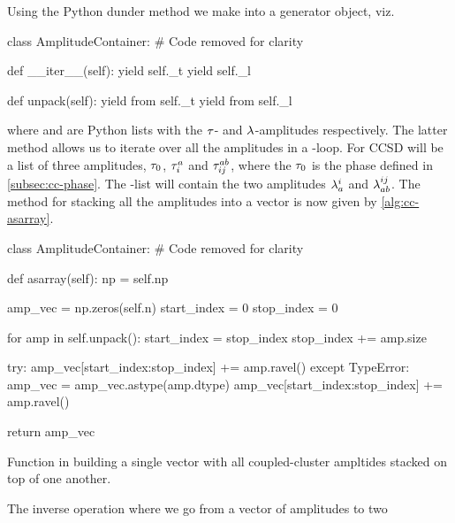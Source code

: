             Using the Python dunder method  we make
             into a generator object, viz.
            \begin{python}
class AmplitudeContainer:
    # Code removed for clarity

    def __iter__(self):
        yield self._t
        yield self._l

    def unpack(self):
        yield from self._t
        yield from self._l
            \end{python}
            where  and  are Python lists with the
            $\tau$- and $\lambda$-amplitudes respectively.
            The latter method  allows us to iterate over all the
            amplitudes in a -loop.
            For CCSD  will be a list of three amplitudes,
            $\tau_0$, $\tau^{a}_{i}$ and $\tau^{ab}_{ij}$, where
            the $\tau_0$ is the phase defined in \autoref{subsec:cc-phase}.
            The -list will contain the two amplitudes
            $\lambda^{i}_{a}$ and $\lambda^{ij}_{ab}$.
            The method for stacking all the amplitudes into a vector is now
            given by \autoref{alg:cc-asarray}.
            \begin{algorithm}
                \begin{python}
class AmplitudeContainer:
    # Code removed for clarity

    def asarray(self):
        np = self.np

        amp_vec = np.zeros(self.n)
        start_index = 0
        stop_index = 0

        for amp in self.unpack():
            start_index = stop_index
            stop_index += amp.size

            try:
                amp_vec[start_index:stop_index] += amp.ravel()
            except TypeError:
                amp_vec = amp_vec.astype(amp.dtype)
                amp_vec[start_index:stop_index] += amp.ravel()

        return amp_vec
                \end{python}
                \caption{Function in  building a single
                vector with all coupled-cluster ampltides stacked on top of one
                another.}
                \label{alg:cc-asarray}
            \end{algorithm}
            The inverse operation where we go from a vector of amplitudes to two
